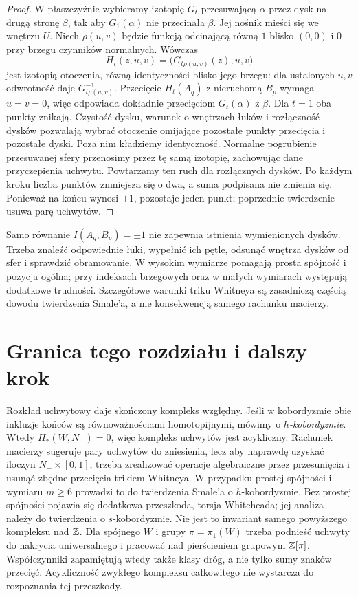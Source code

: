 \begin{proof}
W płaszczyźnie wybieramy izotopię $G_t$ przesuwającą $\alpha$
przez dysk na drugą stronę $\beta$, tak aby $G_1(\alpha)$
nie przecinała $\beta$. Jej nośnik mieści się we wnętrzu $U$.
Niech $\rho(u,v)$ będzie funkcją odcinającą równą $1$ blisko
$(0,0)$ i $0$ przy brzegu czynników normalnych. Wówczas
\[
 H_t(z,u,v)=\bigl(G_{t\rho(u,v)}(z),u,v\bigr)
\]
jest izotopią otoczenia, równą identyczności blisko jego brzegu:
dla ustalonych $u,v$ odwrotność daje $G_{t\rho(u,v)}^{-1}$.
Przecięcie $H_t(A_q)$ z nieruchomą $B_p$ wymaga $u=v=0$,
więc odpowiada dokładnie przecięciom $G_t(\alpha)$ z $\beta$.
Dla $t=1$ oba punkty znikają. Czystość dysku, warunek o wnętrzach
łuków i rozłączność dysków pozwalają wybrać otoczenie omijające
pozostałe punkty przecięcia i pozostałe dyski. Poza nim kładziemy
identyczność. Normalne pogrubienie przesuwanej sfery przenosimy
przez tę samą izotopię, zachowując dane przyczepienia uchwytu.
Powtarzamy ten ruch dla rozłącznych
dysków. Po każdym kroku liczba
punktów zmniejsza się o dwa, a
suma podpisana nie zmienia się.
Ponieważ na końcu wynosi $\pm1$,
pozostaje jeden punkt; poprzednie
twierdzenie usuwa parę uchwytów.
\end{proof}

\begin{uwaga}
Samo równanie $I(A_q,B_p)=\pm1$
nie zapewnia istnienia wymienionych
dysków. Trzeba znaleźć odpowiednie
łuki, wypełnić ich pętle, odsunąć
wnętrza dysków od sfer i sprawdzić
obramowanie. W wysokim wymiarze
pomagają prosta spójność i pozycja
ogólna; przy indeksach brzegowych
oraz w małych wymiarach występują
dodatkowe trudności. Szczegółowe
warunki triku Whitneya są zasadniczą
częścią dowodu twierdzenia Smale'a,
a nie konsekwencją samego rachunku
macierzy.
\end{uwaga}

\section{Granica tego rozdziału i dalszy krok}
\label{sec:uchwyty-smale-most-18}

Rozkład uchwytowy daje skończony
kompleks względny. Jeśli w kobordyzmie
obie inkluzje końców są równoważnościami
homotopijnymi, mówimy o
\emph{$h$-kobordyzmie}. Wtedy
$H_*(W,N_-)=0$, więc kompleks
uchwytów jest acykliczny.
Rachunek macierzy sugeruje pary
uchwytów do zniesienia, lecz
aby naprawdę uzyskać iloczyn
$N_-\times[0,1]$, trzeba
zrealizować operacje algebraiczne
przez przesunięcia i usunąć
zbędne przecięcia trikiem Whitneya.
W przypadku prostej spójności i
wymiaru $m\geq6$ prowadzi to do
twierdzenia Smale'a o $h$-kobordyzmie.
Bez prostej spójności pojawia się
dodatkowa przeszkoda, torsja
Whiteheada; jej analiza należy
do twierdzenia o $s$-kobordyzmie.
Nie jest to inwariant samego powyższego kompleksu nad $\mathbb{Z}$.
Dla spójnego $W$ i grupy $\pi=\pi_1(W)$ trzeba podnieść uchwyty
do nakrycia uniwersalnego i pracować nad pierścieniem
grupowym $\mathbb{Z}[\pi]$. Współczynniki zapamiętują wtedy
także klasy dróg, a nie tylko sumy znaków przecięć.
Acykliczność zwykłego kompleksu całkowitego
nie wystarcza do rozpoznania tej przeszkody.

